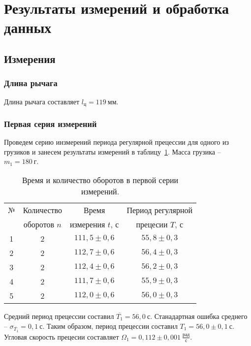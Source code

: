 \documentclass[a4paper,11pt]{article}
\begin{document}
\section{Результаты измерений и обработка данных}
\subsection{Измерения}
\subsubsection{Длина рычага}
Длина рычага составляет $l_{ц} = 119\ мм$.
\subsubsection{Первая серия измерений} %
Проведем серию инзмерений периода регулярной прецессии для одного из грузиков и занесем результаты измерений в таблицу~\ref{table:tab1}.\newline
Масса грузика -- $m_{1} = 180\ г$.
\begin{table}[h!]
\centering
\begin{tabular}{ ||c|c|c|c|| }
  \hline
  № & Количество & Время & Период регулярной \\
   & оборотов $n$ & измерения $t$, $с$ & прецесии $T$, $с$ \\
  \hline
  1 & 2 & $111,5 \pm 0,6$ & $55,8 \pm 0,3$ \\
  2 & 2 & $112,7 \pm 0,6$ & $56,4 \pm 0,3$ \\
  3 & 2 & $112,4 \pm 0,6$ & $56,2 \pm 0,3$ \\
  4 & 2 & $111,7 \pm 0,6$ & $55,9 \pm 0,3$ \\
  5 & 2 & $112,0 \pm 0,6$ & $56,0 \pm 0,3$ \\
  \hline
\end{tabular}
\caption{Время и количество оборотов в первой серии измерений.}
\label{table:tab1}
\end{table}\newline
Средний период прецессии составил $\overline{T_{1}} = 56,0\ с$.\newline
Станадартная ошибка среднего -- $\sigma_{\overline{T_{1}}}= 0,1\ с$.\newline
Таким образом, период прецессии составил $T_{1} = 56,0 \pm 0,1\ с$.\newline
Угловая скорость прецесии составляет $\Omega_{1} = 0,112 \pm 0,001\ \frac{рад}{с}$.
\end{document}
